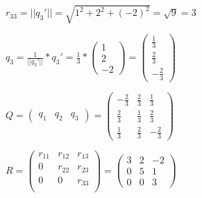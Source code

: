 \documentclass[10pt,a4paper]{article}
\begin{document}
$r_{33}=||q_3'||=\sqrt{1^2+2^2+(-2)^2}=\sqrt{9}=3$

$q_3 = \frac{1}{||q_3'||}*q_3'=\frac{1}{3}*\begin{pmatrix}
    1\\
    2\\
    -2
\end{pmatrix}=\begin{pmatrix}
    \frac{1}{3}  \\
    \frac{2}{3}  \\
    -\frac{2}{3}
\end{pmatrix}$

$Q=\begin{pmatrix}
    q_1 & q_2 & q_3
\end{pmatrix}=\begin{pmatrix}
        -\frac{2}{3} & \frac{2}{3} & \frac{1}{3}  \\
        \frac{2}{3}  & \frac{1}{3} & \frac{2}{3}  \\
        \frac{1}{3}  & \frac{2}{3} & -\frac{2}{3}
    \end{pmatrix}$

$R=\begin{pmatrix}
    r_{11}&r_{12}&r_{13}\\
    0&r_{22}&r_{23}\\
    0&0&r_{33}\\
\end{pmatrix}=\begin{pmatrix}
        3 & 2 & -2 \\
        0 & 5 & 1  \\
        0 & 0 & 3
    \end{pmatrix}$
\end{document}
